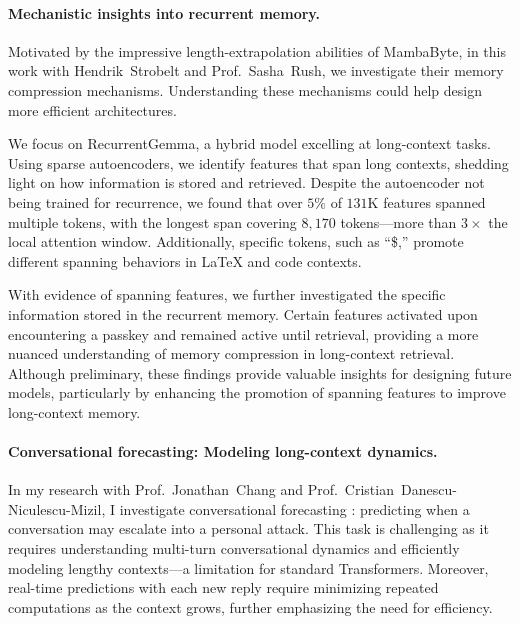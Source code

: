 
\paragraph{Mechanistic insights into recurrent memory.}
% 
Motivated by the impressive length-extrapolation abilities of MambaByte, in this work with Hendrik~Strobelt and Prof.~Sasha~Rush, we investigate their memory compression mechanisms.
% 
Understanding these mechanisms could help design more efficient architectures.

We focus on RecurrentGemma, a hybrid model excelling at long-context tasks.
% 
Using sparse autoencoders, we identify features that span long contexts, shedding light on how information is stored and retrieved.
% 
Despite the autoencoder not being trained for recurrence, we found that over $5\%$ of $131$K features spanned multiple tokens, with the longest span covering $8,170$ tokens---more than $3\times$ the local attention window.
% 
Additionally, specific tokens, such as ``\$,'' promote different spanning behaviors in LaTeX and code contexts.

With evidence of spanning features, we further investigated the specific information stored in the recurrent memory.
% 
Certain features activated upon encountering a passkey and remained active until retrieval, providing a more nuanced understanding of memory compression in long-context retrieval.
% 
Although preliminary, these findings provide valuable insights for designing future models, particularly by enhancing the promotion of spanning features to improve long-context memory.


\paragraph{Conversational forecasting: Modeling long-context dynamics.}
% 
In my research with Prof.~Jonathan~Chang and Prof.~Cristian~Danescu-Niculescu-Mizil, I investigate conversational forecasting \citep{chang_trouble_2019}: predicting when a conversation may escalate into a personal attack.
%
This task is challenging as it requires understanding multi-turn conversational dynamics and efficiently modeling lengthy contexts---a limitation for standard Transformers.
%
Moreover, real-time predictions with each new reply require minimizing repeated computations as the context grows, further emphasizing the need for efficiency.

